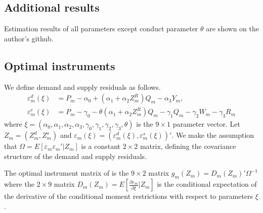 \documentclass[11pt, a4paper]{article}
\begin{document}
\subsection{Additional results}
Estimation results of all parameters except conduct parameter $\theta$ are shown on the author's github.

\subsection{Optimal instruments}
We define demand and supply residuals as follows.
\begin{align*}
    \varepsilon^{d}_{m}(\xi) &= P_m - \alpha_0 + (\alpha_1 + \alpha_2Z^{R}_{m})Q_{m} - \alpha_3 Y_m,\\
    \varepsilon^c_m(\xi) &= P_{m} - \gamma_0 - \theta (\alpha_1 + \alpha_2 Z^{R}_m)Q_{m} - \gamma_1 Q_{m} - \gamma_2 W_m - \gamma_3 R_{m}
\end{align*}
where $\xi=\left(\alpha_0, \alpha_1, \alpha_2, \alpha_3, \gamma_0, \gamma_1, \gamma_2, \gamma_3, \theta\right)$ is the $9\times 1$ parameter vector. 
Let $Z_{m}=(Z_{m}^{d},Z_{m}^{s})$ and $\varepsilon_{m}(\xi)=(\varepsilon_{m}^{d}(\xi),\varepsilon_{m}^{s}(\xi))'$.
We make the assumption that $\Omega=E[\varepsilon_{m}\varepsilon_{m}'|Z_{m}]$ is a constant $2\times 2$ matrix, defining the covariance structure of the demand and supply residuals.
 
The optimal instrument matrix of \cite{chamberlain1987asymptotic} is the $9\times 2$ matrix $g_{m}(Z_{m})=D_{m}(Z_{m})'\Omega^{-1}$
where the $2\times 9$ matrix $D_{m}(Z_{m})=E\left[\frac{\partial \varepsilon_{m}}{\partial \xi}| Z_{m}\right]$ is the conditional expectation of the derivative of the conditional moment restrictions with respect to parameters $\xi$. 
\end{document}
